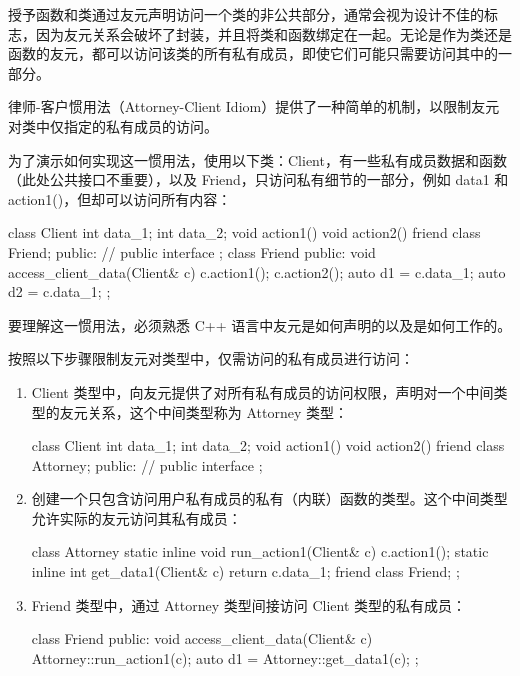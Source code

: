 
授予函数和类通过友元声明访问一个类的非公共部分，通常会视为设计不佳的标志，因为友元关系会破坏了封装，并且将类和函数绑定在一起。无论是作为类还是函数的友元，都可以访问该类的所有私有成员，即使它们可能只需要访问其中的一部分。

律师-客户惯用法（Attorney-Client Idiom）提供了一种简单的机制，以限制友元对类中仅指定的私有成员的访问。


为了演示如何实现这一惯用法，使用以下类：Client，有一些私有成员数据和函数（此处公共接口不重要），以及 Friend，只访问私有细节的一部分，例如 data1 和 action1()，但却可以访问所有内容：

\begin{cpp}
class Client
{
    int data_1;
    int data_2;
    void action1() {}
    void action2() {}
    friend class Friend;
public:
    // public interface
};
class Friend
{
public:
    void access_client_data(Client& c)
    {
        c.action1();
        c.action2();
        auto d1 = c.data_1;
        auto d2 = c.data_1;
    }
};
\end{cpp}

要理解这一惯用法，必须熟悉 C++ 语言中友元是如何声明的以及是如何工作的。


按照以下步骤限制友元对类型中，仅需访问的私有成员进行访问：

\begin{enumerate}
\item
Client 类型中，向友元提供了对所有私有成员的访问权限，声明对一个中间类型的友元关系，这个中间类型称为 Attorney 类型：

\begin{cpp}
class Client
{
    int data_1;
    int data_2;
    void action1() {}
    void action2() {}
    friend class Attorney;
public:
    // public interface
};
\end{cpp}

\item
创建一个只包含访问用户私有成员的私有（内联）函数的类型。这个中间类型允许实际的友元访问其私有成员：

\begin{cpp}
class Attorney
{
    static inline void run_action1(Client& c)
    {
        c.action1();
    }
    static inline int get_data1(Client& c)
    {
        return c.data_1;
    }
    friend class Friend;
};
\end{cpp}

\item
Friend 类型中，通过 Attorney 类型间接访问 Client 类型的私有成员：

\begin{cpp}
class Friend
{
public:
    void access_client_data(Client& c)
    {
        Attorney::run_action1(c);
        auto d1 = Attorney::get_data1(c);
    }
};
\end{cpp}
\end{enumerate}

